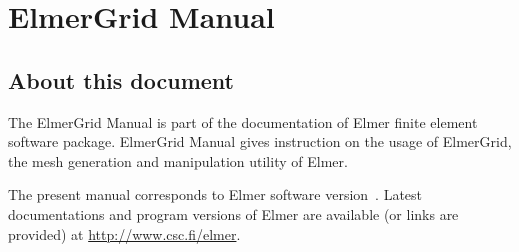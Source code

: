 \chapter*{ElmerGrid Manual}

\section*{About this document}

The ElmerGrid Manual is part of the documentation of 
Elmer finite element software package.
ElmerGrid Manual gives instruction 
on the usage of ElmerGrid, the mesh generation and manipulation utility of Elmer.

The present manual
corresponds to Elmer software version~\elmerversion{}. 
Latest documentations and program versions of Elmer are available (or links are provided) at 
\url{http://www.csc.fi/elmer}.





